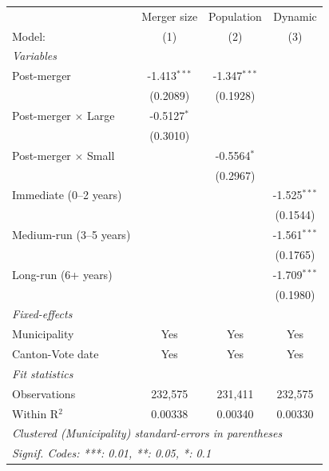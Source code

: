 \begin{tabular}{lccc}
   \tabularnewline \midrule \midrule
                               & Merger size    & Population     & Dynamic \\   
   Model:                      & (1)            & (2)            & (3)\\  
   \midrule
   \emph{Variables}\\
   Post-merger                 & -1.413$^{***}$ & -1.347$^{***}$ &   \\   
                               & (0.2089)       & (0.1928)       &   \\   
   Post-merger $\times$ Large  & -0.5127$^{*}$  &                &   \\   
                               & (0.3010)       &                &   \\   
   Post-merger $\times$ Small  &                & -0.5564$^{*}$  &   \\   
                               &                & (0.2967)       &   \\   
   Immediate (0--2 years)      &                &                & -1.525$^{***}$\\   
                               &                &                & (0.1544)\\   
   Medium-run (3--5 years)     &                &                & -1.561$^{***}$\\   
                               &                &                & (0.1765)\\   
   Long-run (6+ years)         &                &                & -1.709$^{***}$\\   
                               &                &                & (0.1980)\\   
   \midrule
   \emph{Fixed-effects}\\
   Municipality                & Yes            & Yes            & Yes\\  
   Canton-Vote date            & Yes            & Yes            & Yes\\  
   \midrule
   \emph{Fit statistics}\\
   Observations                & 232,575        & 231,411        & 232,575\\  
   Within R$^2$                & 0.00338        & 0.00340        & 0.00330\\  
   \midrule \midrule
   \multicolumn{4}{l}{\emph{Clustered (Municipality) standard-errors in parentheses}}\\
   \multicolumn{4}{l}{\emph{Signif. Codes: ***: 0.01, **: 0.05, *: 0.1}}\\
\end{tabular}
